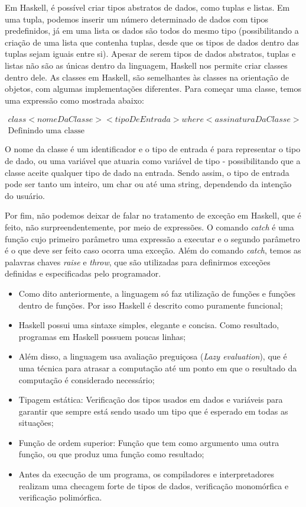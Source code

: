 Em Haskell, é possível criar tipos abstratos de dados, como tuplas e listas. Em uma tupla, podemos inserir um número determinado de dados com tipos predefinidos, já em uma lista os dados são
todos do mesmo tipo (possibilitando a criação de uma lista que contenha tuplas, desde que os tipos de dados dentro das tuplas sejam iguais entre si). Apesar de serem tipos de dados abstratos,
tuplas e listas não são as únicas dentro da linguagem, Haskell nos permite criar classes dentro dele.
As classes em Haskell, são semelhantes às classes na orientação de objetos, com algumas implementações diferentes.
Para começar uma classe, temos uma expressão como mostrada abaixo:

\begin{gather*}
  class<nomeDaClasse><tipoDeEntrada>where<assinaturaDaClasse> \\
  \text{Definindo uma classe}
\end{gather*}

O nome da classe é um identificador e o tipo de entrada é para representar o tipo de dado, ou uma variável que atuaria como variável de tipo - possibilitando que a classe aceite qualquer tipo
de dado na entrada. Sendo assim, o tipo de entrada pode ser tanto um inteiro, um char ou até uma string, dependendo da intenção do usuário.

Por fim, não podemos deixar de falar no tratamento de exceção em Haskell, que é feito, não surpreendentemente, por meio de expressões. O comando \emph{catch} é uma função cujo primeiro parâmetro
uma expressão a executar e o segundo parâmetro é o que deve ser feito caso ocorra uma exceção. Além do comando \emph{catch}, temos as palavras chaves \emph{raise} e \emph{throw}, que são utilizadas para definirmos
exceções definidas e especificadas pelo programador.

\begin{itemize}
  \item Como dito anteriormente, a linguagem só faz utilização de funções e funções dentro de funções. Por isso
  Haskell é descrito como puramente funcional;
  \item Haskell possui uma sintaxe simples, elegante e concisa. Como resultado, programas em Haskell possuem 
  poucas linhas;
  \item Além disso, a linguagem usa avaliação preguiçosa (\emph{Lazy evaluation}), que é uma técnica para atrasar a computação 
  até um ponto em que o resultado da computação é considerado necessário;
  \item Tipagem estática: Verificação dos tipos usados em dados e variáveis para 
  garantir que sempre está sendo usado um tipo que é esperado em todas as situações; 
  \item Função de ordem superior: Função que tem como argumento uma outra função, ou que produz 
  uma função como resultado;
  \item Antes da execução de um programa, os compiladores e interpretadores realizam uma checagem forte de tipos
  de dados, verificação monomórfica e verificação polimórfica.
\end{itemize}

\newpage